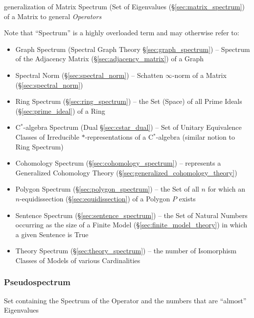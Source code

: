 generalization of Matrix Spectrum (Set of Eigenvalues
(\S\ref{sec:matrix_spectrum}) of a Matrix to general \emph{Operators}

\fist Note that ``Spectrum'' is a highly overloaded term and may otherwise
refer to:
\begin{itemize}
  \item Graph Spectrum (Spectral Graph Theory \S\ref{sec:graph_spectrum}) --
    Spectrum of the Adjacency Matrix (\S\ref{sec:adjacency_matrix}) of a Graph

  \item Spectral Norm (\S\ref{sec:spectral_norm}) -- Schatten $\infty$-norm of
    a Matrix (\S\ref{sec:spectral_norm})

  \item Ring Spectrum (\S\ref{sec:ring_spectrum}) -- the Set (Space) of all
    Prime Ideals (\S\ref{sec:prime_ideal}) of a Ring
  \item C$^*$-algebra Spectrum (Dual \S\ref{sec:cstar_dual}) -- Set of Unitary
    Equivalence Classes of Irreducible $*$-representations of a C$^*$-algebra
    (similar notion to Ring Spectrum)

  \item Cohomology Spectrum (\S\ref{sec:cohomology_spectrum}) -- represents a
    Generalized Cohomology Theory (\S\ref{sec:generalized_cohomology_theory})

  \item Polygon Spectrum (\S\ref{sec:polygon_spectrum}) -- the Set of all $n$
    for which an $n$-equidissection (\S\ref{sec:equidissection}) of a Polygon
    $P$ exists

  \item Sentence Spectrum (\S\ref{sec:sentence_spectrum}) -- the Set of Natural
    Numbers occurring as the size of a Finite Model
    (\S\ref{sec:finite_model_theory}) in which a given Sentence is True
  \item Theory Spectrum (\S\ref{sec:theory_spectrum}) -- the number of
    Isomorphism Classes of Models of various Cardinalities
\end{itemize}



\subsubsection{Pseudospectrum}\label{sec:pseudospectrum}

Set containing the Spectrum of the Operator and the numbers that are ``almost''
Eigenvalues



